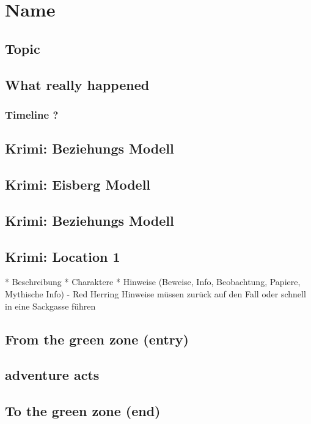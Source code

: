 
\chapter{Name}
\label{ch:Label name}

\section{Topic}
\section{What really happened}

\subsection{Timeline ?}

\section{Krimi: Beziehungs Modell}

\section{Krimi: Eisberg Modell}

\section{Krimi: Beziehungs Modell}

\section{Krimi: Location 1}

* Beschreibung
* Charaktere
* Hinweise (Beweise, Info, Beobachtung, Papiere, Mythische Info) - Red Herring Hinweise müssen zurück auf den Fall oder schnell in eine Sackgasse führen


\section{From the green zone (entry)}

\section{adventure acts}

\section{To the green zone (end)}

